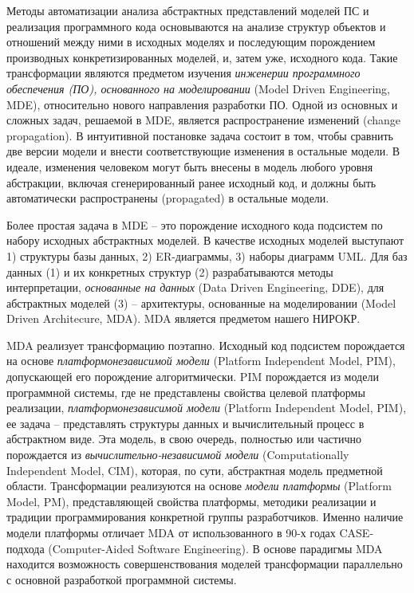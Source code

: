 \documentclass[12pt]{article}
\begin{document}
Методы автоматизации анализа абстрактных представлений моделей ПС и реализация программного кода основываются на анализе структур объектов и отношений между ними в исходных моделях и последующим порождением производных конкретизированных моделей, и, затем уже, исходного кода.  Такие трансформации являются предметом изучения \emph{инженерии программного обеспечения (ПО), основанного на моделировании} (Model Driven Engineering, MDE), относительно нового направления разработки ПО.  Одной из основных и сложных задач, решаемой в MDE, является распространение изменений (change propagation).  В интуитивной постановке задача состоит в том, чтобы сравнить две версии модели и внести соответствующие изменения в остальные модели.  В идеале, изменения человеком могут быть внесены в модель любого уровня абстракции, включая сгенерированный ранее исходный код, и должны быть автоматически распространены (propagated) в остальные модели.

Более простая задача в MDE -- это порождение исходного кода подсистем по набору исходных абстрактных моделей.  В качестве исходных моделей выступают 1) структуры базы данных, 2) ER-диаграммы, 3) наборы диаграмм UML.  Для баз данных (1) и их конкретных структур (2) разрабатываются методы интерпретации, \emph{основанные на данных} (Data Driven Engineering, DDE), для абстрактных моделей (3) -- архитектуры, основанные на моделировании (Model Driven Architecure, MDA).  MDA является предметом нашего НИРОКР.

MDA реализует трансформацию поэтапно.  Исходный код подсистем порождается на основе \emph{платформонезависимой модели} (Platform Independent Model, PIM), допускающей его порождение алгоритмически.  PIM порождается из модели программной системы, где не представлены свойства целевой платформы реализации, \emph{платформонезависимой модели} (Platform Independent Model, PIM), ее задача -- представлять структуры данных и вычислительный процесс в абстрактном виде.  Эта модель, в свою очередь, полностью или частично порождается из \emph{вычислительно-независимой модели} (Computationally Independent Model, CIM), которая, по сути, абстрактная модель предметной области.  Трансформации реализуются на основе \emph{модели платформы} (Platform Model, PM), представляющей свойства платформы, методики реализации и традиции программирования конкретной группы разработчиков.  Именно наличие модели платформы отличает MDA от использованного в 90-х годах CASE-подхода (Computer-Aided Software Engineering).  В основе парадигмы MDA находится возможность совершенствования моделей трансформации параллельно с основной разработкой программной системы.
\end{document}
